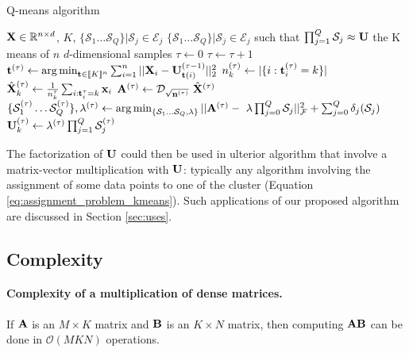 \documentclass{article}
\begin{document}
\begin{algorithm}
\caption{Q-means algorithm}
\label{algo:qmeans}
\begin{algorithmic}[1]


\REQUIRE ${\mathbf{X}} \in \mathbb{R}^{n \times d}$, $K$, $\{\mathcal{S}_1 \dots \mathcal{S}_{Q}\}|\mathcal{S}_j \in \mathcal{E}_j$
\ENSURE $\{\mathcal{S}_1 \dots \mathcal{S}_{Q}\}|\mathcal{S}_j \in \mathcal{E}_j$ such that $\prod_{j=1}^{Q}\mathcal{S}_j \approx {\mathbf{U}}$ the K means of $n$ $d$-dimensional samples
\STATE $\tau \leftarrow 0$
\REPEAT
\STATE $\tau \leftarrow \tau + 1$
\STATE ${\mathbf{t}}^{(\tau)} \leftarrow \operatorname*{arg\,min}_{{\mathbf{t}} \in [\![K]\!]^n} \sum_{i=1}^{n} {||{\mathbf{X}}_i - {\mathbf{U}}^{(\tau -1)}_{{\mathbf{t}}(i)}||_2^2}$
\label{line:qmeans:assignment}
\label{line:qmeans:startkmeans}
\STATE $n_k^{(\tau)} \leftarrow |\{i: {\mathbf{t}}^{(\tau)}_i=k\}|$
\STATE $\hat{{\mathbf{X}}}^{(\tau)}_k \leftarrow \frac{1}{n^\tau_k} \sum_{i: {\mathbf{t}}^\tau_i = k} {{\mathbf{x}}_i}$
\ENDFOR
\label{line:qmeans:endkmeans}
\STATE ${\mathbf{A}}^{(\tau)} \leftarrow \mathcal{D}_{\sqrt{{\mathbf{n}}^{(\tau)}}}~\hat{{\mathbf{X}}}^{(\tau)} $
\STATE $\{\mathcal{S}^{(\tau)}_1 \dots \mathcal{S}^{(\tau)}_{Q}\}, \lambda^{(\tau)} \leftarrow \operatorname*{arg\,min}_{\{\mathcal{S}_1 \dots \mathcal{S}_Q, \lambda\}} ||{\mathbf{A}}^{(\tau)} - ~\lambda\prod_{j=0}^{Q}{\mathcal{S}_j}||_\mathcal{F}^2 + \sum_{j=0}^{Q} \delta_j(\mathcal{S}_j)$
\STATE ${\mathbf{U}}^{(\tau)}_k \leftarrow \lambda^{(\tau)} \prod_{j=1}^{Q}{\mathcal{S}_j^{(\tau)}}$

\end{algorithmic}
\end{algorithm}

The factorization of ${\mathbf{U}}$ could then be used in ulterior algorithm that involve a matrix-vector multiplication with ${\mathbf{U}}$: typically any algorithm involving the assignment of some data points to one of the cluster (Equation \ref{eq:assignment_problem_kmeans}). Such applications of our proposed algorithm are discussed in Section \ref{sec:uses}.

\subsection{Complexity}
\paragraph{Complexity of a multiplication of dense matrices.}
If ${\mathbf{A}}$ is an $M\times K $ matrix and ${\mathbf{B}}$ is an $K \times N$ matrix, then computing ${\mathbf{A}} {\mathbf{B}}$ can be done in $\mathcal{O}\left (MKN\right )$ operations.
\end{document}

